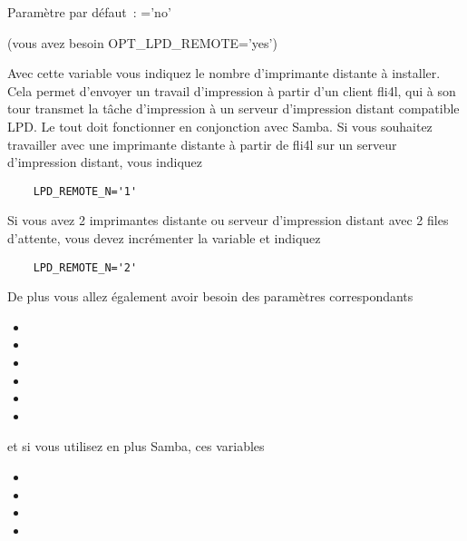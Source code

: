 \begin{description}
    Paramètre par défaut~: ='no'


 (vous avez besoin OPT\_LPD\_REMOTE='yes')

    Avec cette variable  vous indiquez le nombre
    d'imprimante distante à installer. Cela permet d'envoyer un travail d'impression
    à partir d'un client fli4l, qui à son tour transmet la tâche d'impression à
    un serveur d'impression distant compatible LPD. Le tout doit fonctionner en
    conjonction avec Samba. Si vous souhaitez travailler avec une imprimante
    distante à partir de fli4l sur un serveur d'impression distant, vous indiquez

\begin{example}
\begin{verbatim}
    LPD_REMOTE_N='1'
\end{verbatim}
\end{example}

    Si vous avez 2 imprimantes distante ou serveur d'impression distant avec
    2 files d'attente, vous devez incrémenter la variable 
    et indiquez

\begin{example}
\begin{verbatim}
    LPD_REMOTE_N='2'
\end{verbatim}
\end{example}

    De plus vous allez également avoir besoin des paramètres correspondants

\begin{itemize}
\item {}
\item {}
\item {}
\item {}
\item {}
\item {}
\end{itemize}

    et si vous utilisez en plus Samba, ces variables

\begin{itemize}
\item {}
\item {}
\item {}
\item {}
\end{itemize}


\end{description}
